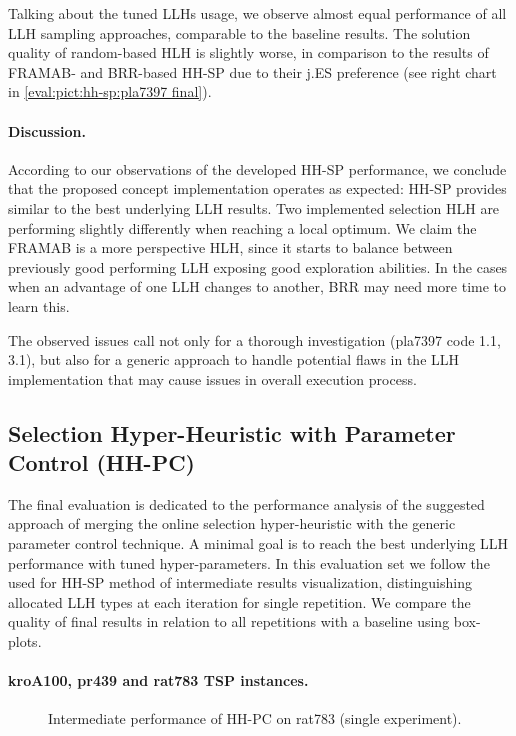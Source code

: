 Talking about the tuned LLHs usage, we observe almost equal performance of all LLH sampling approaches, comparable to the baseline results. The solution quality of random-based HLH is slightly worse, in comparison to the results of FRAMAB- and BRR-based HH-SP due to their j.ES preference (see right chart in \cref{eval:pict:hh-sp:pla7397 final}).

\paragraph{Discussion.} According to our observations of the developed HH-SP performance, we conclude that the proposed concept implementation operates as expected: HH-SP provides similar to the best underlying LLH results. Two implemented selection HLH are performing slightly differently when reaching a local optimum. We claim the FRAMAB is a more perspective HLH, since it starts to balance between previously good performing LLH exposing good exploration abilities. In the cases when an advantage of one LLH changes to another, BRR may need more time to learn this.

The observed issues call not only for a thorough investigation (pla7397 code 1.1, 3.1), but also for a generic approach to handle potential flaws in the LLH implementation that may cause issues in overall execution process.


\subsection{Selection Hyper-Heuristic with Parameter Control (HH-PC)}\label{eval:1:hh-pc}
The final evaluation is dedicated to the performance analysis of the suggested approach of merging the online selection hyper-heuristic with the generic parameter control technique. A minimal goal is to reach the best underlying LLH performance with tuned hyper-parameters. In this evaluation set we follow the used for HH-SP method of intermediate results visualization, distinguishing allocated LLH types at each iteration for single repetition. We compare the quality of final results in relation to all repetitions with a baseline using box-plots.

\paragraph{kroA100, pr439 and rat783 TSP instances.}
\begin{figure}[b]
	\centering
	\vspace{-20pt}
	
	\caption{Intermediate performance of HH-PC on rat783 (single experiment).}
	\vspace{-5pt}
	\label{eval:pict:hh-pc:rat783 intermediate}
\end{figure}

